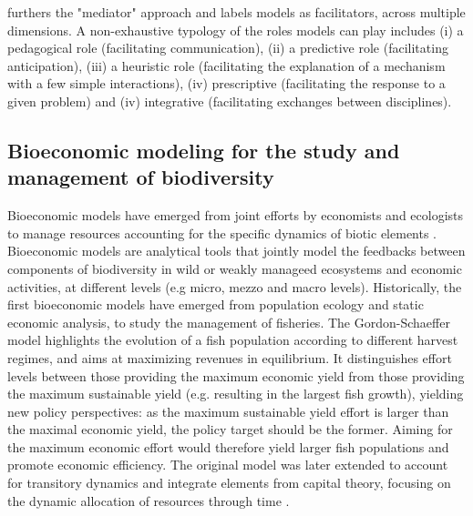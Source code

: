 \begin{tcolorbox}[breakable, 
colback=verylightgray, 
colframe=gray!75!black, 
title= {Box 3 - What do models do? },
fontupper=\small]

 \cite{varenne_epistemologie_2014} furthers the "mediator" approach and labels models as facilitators, across multiple dimensions. A non-exhaustive typology of the roles models can play includes (i) a pedagogical role (facilitating communication), (ii) a predictive role (facilitating anticipation), (iii) a heuristic role (facilitating the explanation of a mechanism with a few simple interactions), (iv) prescriptive (facilitating the response to a given problem) and (iv) integrative (facilitating exchanges between disciplines). 

\end{tcolorbox}


\subsection*{Bioeconomic modeling for the study and management of biodiversity}
Bioeconomic models \citep{Gordon1954, smith_models_1969, clark_profit_1973} have emerged from joint efforts by economists and ecologists to manage resources accounting for the specific dynamics of biotic elements \citep{Parent_Mouysset_Missemer_Levrel_2024}. Bioeconomic models are analytical tools that jointly model the feedbacks between components of biodiversity in wild or weakly manageed ecosystems and economic activities, at different levels (e.g micro, mezzo and macro levels). 
Historically, the first bioeconomic models have emerged from population ecology and static economic analysis, to study the management of fisheries. The Gordon-Schaeffer model highlights the evolution of a fish population according to different harvest regimes, and aims at maximizing revenues in equilibrium. It distinguishes effort levels between those providing the maximum economic yield from those providing the maximum sustainable yield (e.g. resulting in the largest fish growth), yielding new policy perspectives: as the maximum sustainable yield effort is larger than the maximal economic yield, the policy target should be the former. Aiming for the maximum economic effort would therefore yield larger fish populations and promote economic efficiency. The original model was later extended to account for transitory dynamics and integrate elements from capital theory, focusing on the dynamic allocation of resources through time \citep{smith_models_1969, clark_profit_1973}. 

